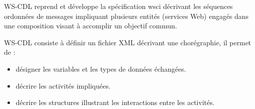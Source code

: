     \textsc{WS-CDL} reprend et développe la spécification
    \acrshort{wsci} décrivant les séquences ordonnées de messages
    impliquant plusieurs entités (services Web) engagés dans une
    composition visant à accomplir un objectif commun.

    \textsc{WS-CDL} consiste à définir un fichier XML décrivant une
    chorégraphie, il permet de \cite{elie2010}:
    \begin{itemize} %
    \item désigner les variables et les types de données échangées.
    \item décrire les  activités impliquées.
    \item décrire les structures illustrant les interactions entre
      les activités.
    \end{itemize}




